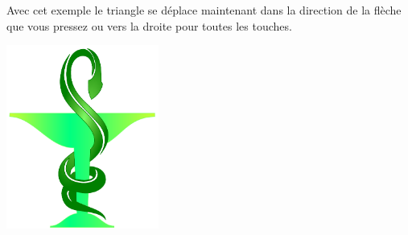 Avec cet exemple le triangle se déplace maintenant dans la direction de la flèche que vous pressez ou vers la droite pour toutes les touches.

 \vfill
\begin{center}
 \includegraphics[width=5cm]{images/Caducee_fr.pdf}
\end{center}
 \vfill
 